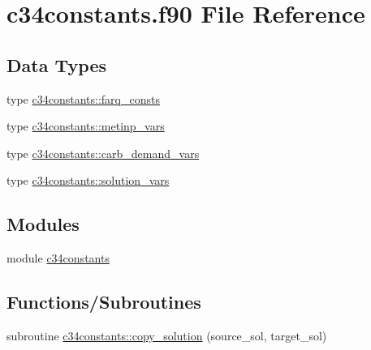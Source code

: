 \hypertarget{c34constants_8f90}{}\section{c34constants.\+f90 File Reference}
\label{c34constants_8f90}
\subsection*{Data Types}
\begin{DoxyCompactItemize}
\item 
type \hyperlink{structc34constants_1_1farq__consts}{c34constants\+::farq\+\_\+consts}
\item 
type \hyperlink{structc34constants_1_1metinp__vars}{c34constants\+::metinp\+\_\+vars}
\item 
type \hyperlink{structc34constants_1_1carb__demand__vars}{c34constants\+::carb\+\_\+demand\+\_\+vars}
\item 
type \hyperlink{structc34constants_1_1solution__vars}{c34constants\+::solution\+\_\+vars}
\end{DoxyCompactItemize}
\subsection*{Modules}
\begin{DoxyCompactItemize}
\item 
module \hyperlink{namespacec34constants}{c34constants}
\end{DoxyCompactItemize}
\subsection*{Functions/\+Subroutines}
\begin{DoxyCompactItemize}
\item 
subroutine \hyperlink{namespacec34constants_a2bf287654403f231d7936113aaeb9cf6}{c34constants\+::copy\+\_\+solution} (source\+\_\+sol, target\+\_\+sol)
\end{DoxyCompactItemize}
